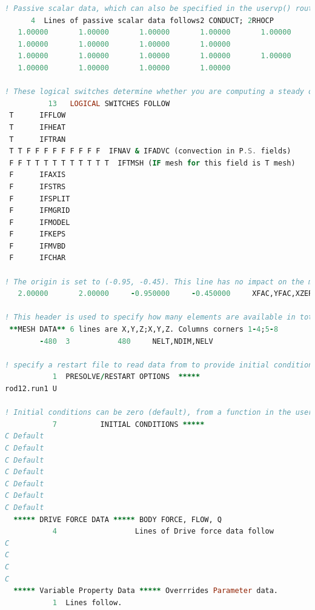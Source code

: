 \documentclass[10pt]{article}
\numberwithin{equation}{section} %
\begin{document}
\begin{itemize}
\begin{lstlisting}[language=Fortran]
! Passive scalar data, which can also be specified in the uservp() routine in the user file, can also be specified in this file. These lines list the values of conductivity in ascending order, followed by the heat capacity coefficients. A total of 9 passive scalars can be transported.
      4  Lines of passive scalar data follows2 CONDUCT; 2RHOCP
   1.00000       1.00000       1.00000       1.00000       1.00000
   1.00000       1.00000       1.00000       1.00000
   1.00000       1.00000       1.00000       1.00000       1.00000
   1.00000       1.00000       1.00000       1.00000

! These logical switches determine whether you are computing a steady or unsteady solution and whether advection is turned on.
          13   LOGICAL SWITCHES FOLLOW
 T      IFFLOW
 T      IFHEAT
 T      IFTRAN
 T T F F F F F F F F F  IFNAV & IFADVC (convection in P.S. fields)
 F F T T T T T T T T T T  IFTMSH (IF mesh for this field is T mesh)
 F      IFAXIS
 F      IFSTRS
 F      IFSPLIT
 F      IFMGRID
 F      IFMODEL
 F      IFKEPS
 F      IFMVBD
 F      IFCHAR
 
! The origin is set to (-0.95, -0.45). This line has no impact on the mesh being read in Nek.
   2.00000       2.00000     -0.950000     -0.450000     XFAC,YFAC,XZERO,YZERO

! This header is used to specify how many elements are available in total, the dimension of the problem, and how many elements are in the flow mesh (the fluid region?). 
 **MESH DATA** 6 lines are X,Y,Z;X,Y,Z. Columns corners 1-4;5-8
        -480  3           480     NELT,NDIM,NELV
        
! specify a restart file to read data from to provide initial conditions (used commonly for these nonlinear equations). This is used to reduce error, since the rod12.run1 file likely was run with a much lower order. For a higher-order timestepping scheme, you'll need an equivalently larger number of restart files to provide the data points for method of lines time integration. This initial condition does not need to be of the same order as the current simulation. You can also specify the velocity and temperature from different files. The initial time is taken from the last specified restart file, but this can be overridden.
           1  PRESOLVE/RESTART OPTIONS  *****
rod12.run1 U

! Initial conditions can be zero (default), from a function in the user file, based on a ``pre-solve'', where a steady-state solution such as the Stokes equation is used as the initial condition for the transient solve, or from a restart file.
           7          INITIAL CONDITIONS *****
C Default
C Default
C Default
C Default
C Default
C Default
C Default
  ***** DRIVE FORCE DATA ***** BODY FORCE, FLOW, Q
           4                  Lines of Drive force data follow
C
C
C
C
  ***** Variable Property Data ***** Overrrides Parameter data.
           1  Lines follow.


\end{lstlisting}
\end{itemize}
\end{document}
